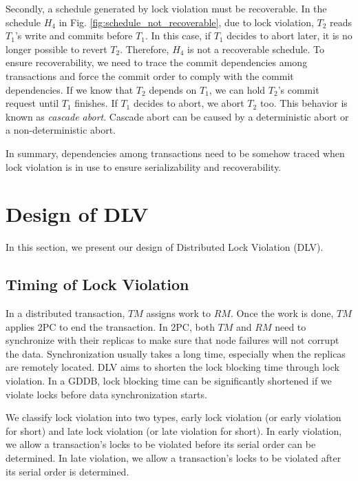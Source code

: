 \documentclass[conference]{IEEEtran}
\begin{document}
Secondly, a schedule generated by lock violation must be recoverable.
In the schedule ${H_4}$ in Fig.   \ref{fig:schedule_not_recoverable}, due to lock violation,
${T_2}$ reads  ${T_1}$'s write and commits before ${T_1}$.
In this case, if ${T_1}$ decides to abort later, it is no longer possible to revert ${T_2}$.
Therefore, ${H_4}$ is not a recoverable schedule.
To ensure recoverability, we need to trace the commit dependencies among transactions and force the commit order to comply with the commit dependencies.
If we know that ${T_2}$ depends on ${T_1}$, we can hold ${T_2}$'s commit request until ${T_1}$ finishes.
If ${T_1}$ decides to abort, we abort ${T_2}$ too.
This behavior is known as \emph{cascade abort}.
Cascade abort can be caused by a deterministic abort or a non-deterministic abort.

In summary, dependencies among transactions need to be somehow traced when lock violation is in use to ensure serializability and recoverability.

\section{Design of DLV}
\label{sec:implement}

In this section, we present our design of Distributed Lock Violation (DLV).

\subsection {Timing of Lock Violation}


In a distributed transaction, $TM$ assigns work to $RM$. Once the work is done, $TM$ applies 2PC to end the transaction.
In 2PC, both $TM$ and $RM$ need to synchronize with their replicas to make sure that node failures will not corrupt the data.
Synchronization usually takes a long time, especially when the replicas are remotely located.
DLV aims to shorten the lock blocking time through lock violation.
In a GDDB, lock blocking time can be significantly shortened if we violate locks before data synchronization starts.

We classify lock violation into two types, early lock violation (or early violation for short) and late lock violation (or late violation for short).
In early violation,  we allow a transaction's locks to be violated before its serial order can be determined.
In late violation,  we allow a transaction's locks to be violated after its serial order is determined.
\end{document}
